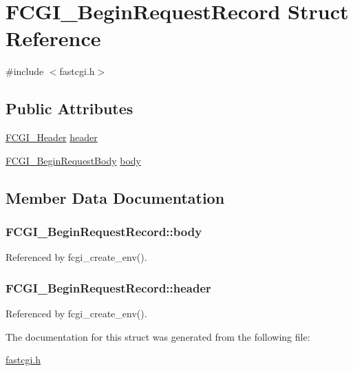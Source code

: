\hypertarget{structFCGI__BeginRequestRecord}{\section{F\-C\-G\-I\-\_\-\-Begin\-Request\-Record Struct Reference}
\label{structFCGI__BeginRequestRecord}
}


{\ttfamily \#include $<$fastcgi.\-h$>$}

\subsection*{Public Attributes}
\begin{DoxyCompactItemize}
\item 
\hyperlink{structFCGI__Header}{F\-C\-G\-I\-\_\-\-Header} \hyperlink{structFCGI__BeginRequestRecord_ab8b4c42ac53355e407c9bb7604dcb9ba}{header}
\item 
\hyperlink{structFCGI__BeginRequestBody}{F\-C\-G\-I\-\_\-\-Begin\-Request\-Body} \hyperlink{structFCGI__BeginRequestRecord_ac3cf1ec5f079fe20a28386bb78dcbe61}{body}
\end{DoxyCompactItemize}


\subsection{Member Data Documentation}
\hypertarget{structFCGI__BeginRequestRecord_ac3cf1ec5f079fe20a28386bb78dcbe61}{
\subsubsection[{body}]{ F\-C\-G\-I\-\_\-\-Begin\-Request\-Record\-::body}}\label{structFCGI__BeginRequestRecord_ac3cf1ec5f079fe20a28386bb78dcbe61}


Referenced by fcgi\-\_\-create\-\_\-env().

\hypertarget{structFCGI__BeginRequestRecord_ab8b4c42ac53355e407c9bb7604dcb9ba}{
\subsubsection[{header}]{ F\-C\-G\-I\-\_\-\-Begin\-Request\-Record\-::header}}\label{structFCGI__BeginRequestRecord_ab8b4c42ac53355e407c9bb7604dcb9ba}


Referenced by fcgi\-\_\-create\-\_\-env().



The documentation for this struct was generated from the following file\-:\begin{DoxyCompactItemize}
\item 
\hyperlink{fastcgi_8h}{fastcgi.\-h}\end{DoxyCompactItemize}
